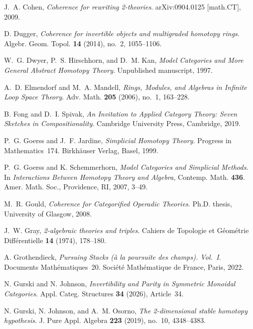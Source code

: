 \documentclass{tac}
\begin{document}
\begin{references*}
J.~A. Cohen,
\emph{Coherence for rewriting 2-theories}.
arXiv:0904.0125 [math.CT], 2009.

D. Dugger,
\emph{Coherence for invertible objects and multigraded homotopy rings}.
Algebr. Geom. Topol. \textbf{14} (2014), no.~2, 1055--1106.

W.~G. Dwyer, P.~S. Hirschhorn, and D.~M. Kan,
\emph{Model Categories and More General Abstract Homotopy Theory}.
Unpublished manuscript, 1997.

A.~D. Elmendorf and M.~A. Mandell,
\emph{Rings, Modules, and Algebras in Infinite Loop Space Theory}.
Adv. Math. \textbf{205} (2006), no.~1, 163--228.

B. Fong and D.~I. Spivak,
\emph{An Invitation to Applied Category Theory: Seven Sketches in Compositionality}.
Cambridge University Press, Cambridge, 2019.


P.~G. Goerss and J.~F. Jardine,
\emph{Simplicial Homotopy Theory}.
Progress in Mathematics~174.
Birkh\"auser Verlag, Basel, 1999.

P.~G. Goerss and K. Schemmerhorn,
\emph{Model Categories and Simplicial Methods}.
In \emph{Interactions Between Homotopy Theory and Algebra},
Contemp. Math. \textbf{436}.
Amer. Math. Soc., Providence, RI, 2007, 3--49.

M.~R. Gould,
\emph{Coherence for Categorified Operadic Theories}.
Ph.D. thesis,
University of Glasgow, 2008.

J.~W. Gray,
\emph{2-algebraic theories and triples}.
Cahiers de Topologie et Géométrie Différentielle \textbf{14} (1974), 178--180.

A. Grothendieck,
\emph{Pursuing Stacks (\`a la poursuite des champs). Vol.~I}.
Documents Math\'ematiques~20.
Soci\'et\'e Math\'ematique de France, Paris, 2022.

N. Gurski and N. Johnson,
\emph{Invertibility and Parity in Symmetric Monoidal Categories}.
Appl. Categ. Structures \textbf{34} (2026), Article~34.

N. Gurski, N. Johnson, and A.~M. Osorno,
\emph{The 2-dimensional stable homotopy hypothesis}.
J. Pure Appl. Algebra \textbf{223} (2019), no.~10, 4348--4383.


\end{references*}
\end{document}

